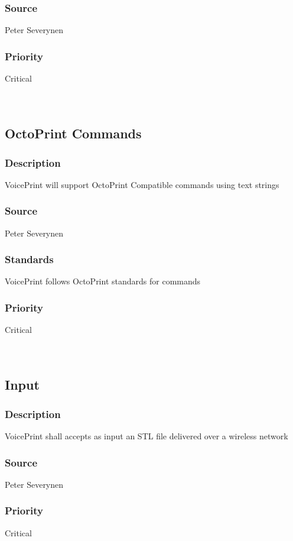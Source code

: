 \subsubsection{Source}
Peter Severynen
\subsubsection{Priority}
Critical\\
\\
\\
\subsection{OctoPrint Commands}
\subsubsection{Description}
VoicePrint will support OctoPrint Compatible commands using text strings
\subsubsection{Source}
Peter Severynen
\subsubsection{Standards}
VoicePrint follows OctoPrint standards for commands \cite{Commands.OctoPrint}
\subsubsection{Priority}
Critical\\
\\
\\
\subsection{Input}
\subsubsection{Description}
VoicePrint shall accepts as input an STL file delivered over a wireless network
\subsubsection{Source}
Peter Severynen
\subsubsection{Priority}
Critical\\
\\
\\
